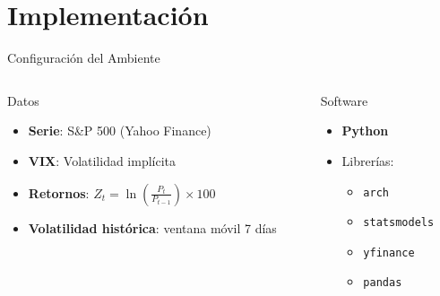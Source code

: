 \section{Implementación}

\begin{frame}{Configuración del Ambiente}
    \begin{columns}
        \begin{column}{0.6\textwidth}
            \begin{block}{Datos}
                \begin{itemize}
                    \item \textbf{Serie}: S\&P 500 (Yahoo Finance)
                    \item \textbf{VIX}: Volatilidad implícita
                    \item \textbf{Retornos}: $Z_t = \ln\left(\frac{P_t}{P_{t-1}}\right) \times 100$
                    \item \textbf{Volatilidad histórica}: ventana móvil 7 días
                \end{itemize}
            \end{block}
        \end{column}
        
        \begin{column}{0.4\textwidth}
            \begin{block}{Software}
                \begin{itemize}
                    \item \textbf{Python}
                    \item Librerías:
                    \begin{itemize}
                        \item \texttt{arch}
                        \item \texttt{statsmodels}
                        \item \texttt{yfinance}
                        \item \texttt{pandas}
                    \end{itemize}
                \end{itemize}
            \end{block}
        \end{column}
    \end{columns}
\end{frame}

